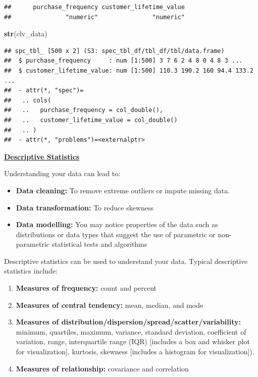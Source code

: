 \documentclass[
]{article}
\newenvironment{Shaded}{\begin{snugshade}}{\end{snugshade}}
\newcommand{\FunctionTok}[1]{\textcolor[rgb]{0.13,0.29,0.53}{\textbf{#1}}}
\newcommand{\NormalTok}[1]{#1}
\begin{document}
\begin{verbatim}
##      purchase_frequency customer_lifetime_value 
##               "numeric"               "numeric"
\end{verbatim}

\begin{Shaded}
\begin{Highlighting}[]
\FunctionTok{str}\NormalTok{(clv\_data)}
\end{Highlighting}
\end{Shaded}

\begin{verbatim}
## spc_tbl_ [500 x 2] (S3: spec_tbl_df/tbl_df/tbl/data.frame)
##  $ purchase_frequency     : num [1:500] 3 7 6 2 4 8 0 4 8 3 ...
##  $ customer_lifetime_value: num [1:500] 110.3 190.2 160 94.4 133.2 ...
##  - attr(*, "spec")=
##   .. cols(
##   ..   purchase_frequency = col_double(),
##   ..   customer_lifetime_value = col_double()
##   .. )
##  - attr(*, "problems")=<externalptr>
\end{verbatim}

\ul{\textbf{Descriptive Statistics}}

Understanding your data can lead to:

\begin{itemize}
\item
  \textbf{Data cleaning:} To remove extreme outliers or impute missing
  data.
\item
  \textbf{Data transformation:} To reduce skewness
\item
  \textbf{Data modelling:} You may notice properties of the data such as
  distributions or data types that suggest the use of parametric or
  non-parametric statistical tests and algorithms
\end{itemize}

Descriptive statistics can be used to understand your data. Typical
descriptive statistics include:

\begin{enumerate}
\def\labelenumi{\arabic{enumi}.}
\item
  \textbf{Measures of frequency:} count and percent
\item
  \textbf{Measures of central tendency:} mean, median, and mode
\item
  \textbf{Measures of
  distribution/dispersion/spread/scatter/variability:} minimum,
  quartiles, maximum, variance, standard deviation, coefficient of
  variation, range, interquartile range (IQR) {[}includes a box and
  whisker plot for visualization{]}, kurtosis, skewness {[}includes a
  histogram for visualization{]}).
\item
  \textbf{Measures of relationship:} covariance and correlation
\end{enumerate}
\end{document}
